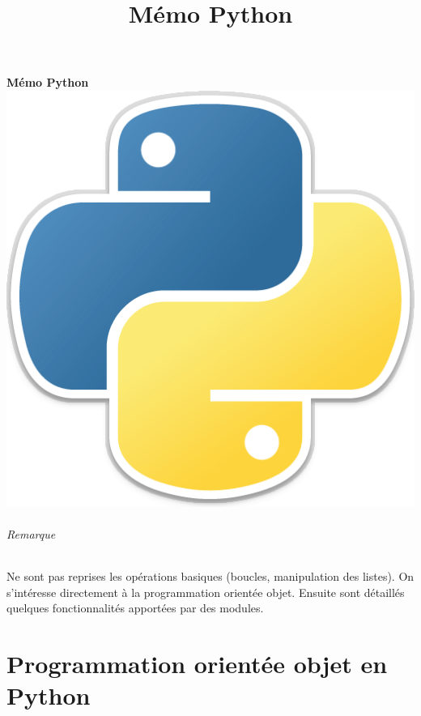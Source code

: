 \documentclass[a4paper, french, 10pt]{article}
\title{Mémo Python}
\begin{document}
\begin{center}
        {\Huge{\sc\bfseries{Mémo Python}}}\\[20pt]
        \includegraphics[scale=0.1]{python.png}
        \vspace{20pt}
\end{center}
\tableofcontents
\hypersetup{linkcolor=blue}

\paragraph{Remarque}
 Ne sont pas reprises les opérations \og basiques \fg{} (boucles, manipulation des listes). On s'intéresse directement à la programmation orientée objet. Ensuite sont détaillés quelques fonctionnalités apportées par des modules.

\part{Programmation orientée objet en Python}
\end{document}
